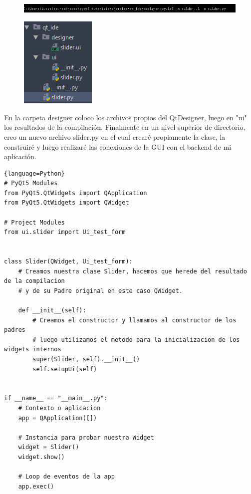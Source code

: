 \begin{figure}[H]
    \centering
    \includegraphics[scale=0.7]{imagenes/qtdesigner/qt_steps_1.PNG}
\end{figure}

\begin{figure}[H]
    \centering
    \includegraphics[scale=0.8]{imagenes/qtdesigner/qt_steps_2.PNG}
\end{figure}

En la carpeta designer coloco los archivos propios del QtDesigner, luego en "ui" los resultados de la compilaci\'on. Finalmente en un nivel superior de directorio,
creo un nuevo archivo slider.py en el cual crear\'e propiamente la clase, la construir\'e y luego realizar\'e las conexiones de la GUI con el backend de mi aplicaci\'on.

\begin{lstlisting}{language=Python}
# PyQt5 Modules
from PyQt5.QtWidgets import QApplication
from PyQt5.QtWidgets import QWidget

# Project Modules
from ui.slider import Ui_test_form


class Slider(QWidget, Ui_test_form):
    # Creamos nuestra clase Slider, hacemos que herede del resultado de la compilacion
    # y de su Padre original en este caso QWidget.

    def __init__(self):
        # Creamos el constructor y llamamos al constructor de los padres
        # luego utilizamos el metodo para la inicializacion de los widgets internos
        super(Slider, self).__init__()
        self.setupUi(self)


if __name__ == "__main__.py":
    # Contexto o aplicacion
    app = QApplication([])

    # Instancia para probar nuestra Widget
    widget = Slider()
    widget.show()

    # Loop de eventos de la app
    app.exec()

\end{lstlisting}

